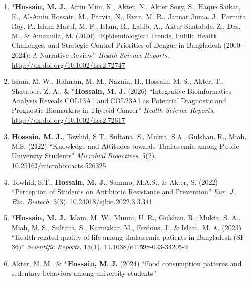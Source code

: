 \documentclass[
  11pt,
  letterpaper,
  DIV=11,
  numbers=noendperiod]{scrartcl}
\providecommand{\tightlist}{%
  \setlength{\itemsep}{0pt}\setlength{\parskip}{0pt}}
\begin{document}
\begin{enumerate}
\def\labelenumi{\arabic{enumi}.}
\tightlist
\item
  *\textbf{Hossain, M. J.}, Afrin Mim, N., Akter, N., Akter Sony, S.,
  Haque Saikat, E., Al-Amin Hossain, M., Parvin, N., Evan, M. R., Jannat
  Juma, J., Parmita Roy, P., Islam Maruf, M. F., Islam, R., Labib, A.,
  Akter Shatabde, Z., Das, M., \& Amanulla, M. (2026) ``Epidemiological
  Trends, Public Health Challenges, and Strategic Control Priorities of
  Dengue in Bangladesh (2000---2024): A Narrative Review'' \emph{Health
  Science Reports}.
  \href{https://doi.org/http://dx.doi.org/10.1002/hsr2.72747}{http://dx.doi.org/10.1002/hsr2.72747}\\
\item
  Islam, M. W., Rahman, M. M., Naznin, H., Hossain, M. S., Akter, T.,
  Shatabde, Z. A., \& *\textbf{Hossain, M. J.} (2026) ``Integrative
  Bioinformatics Analysis Reveals COL13A1 and COL23A1 as Potential
  Diagnostic and Prognostic Biomarkers in Thyroid Cancer'' \emph{Health
  Science Reports}.
  \href{https://doi.org/http://dx.doi.org/10.1002/hsr2.72617}{http://dx.doi.org/10.1002/hsr2.72617}\\
\item
  \textbf{Hossain, M. J.}, Towhid, S.T., Sultana, S., Mukta, S.A.,
  Gulshan, R., Miah, M.S. (2022) ``Knowledge and Attitudes towards
  Thalassemia among Public University Students'' \emph{Microbial
  Bioactives}. 5(2).
  \href{https://doi.org/10.25163/microbbioacts.526325}{10.25163/microbbioacts.526325}\\
\item
  Towhid, S.T., \textbf{Hossain, M. J.}, Sammo, M.A.S., \& Akter, S.
  (2022) ``Perception of Students on Antibiotic Resistance and
  Prevention'' \emph{Eur. J. Bio. Biotech}. 3(3).
  \href{https://doi.org/10.24018/ejbio.2022.3.3.341}{10.24018/ejbio.2022.3.3.341}\\
\item
  *\textbf{Hossain, M. J.}, Islam, M. W., Munni, U. R., Gulshan, R.,
  Mukta, S. A., Miah, M. S., Sultana, S., Karmakar, M., Ferdous, J., \&
  Islam, M. A. (2023) ``Health-related quality of life among thalassemia
  patients in Bangladesh (SF-36)'' \emph{Scientific Reports}. 13(1).
  \href{https://doi.org/10.1038/s41598-023-34205-9}{10.1038/s41598-023-34205-9}\\
\item
  Akter, M. M., \& *\textbf{Hossain, M. J.} (2024) ``Food consumption
  patterns and sedentary behaviors among university students''

\end{enumerate}
\end{document}
